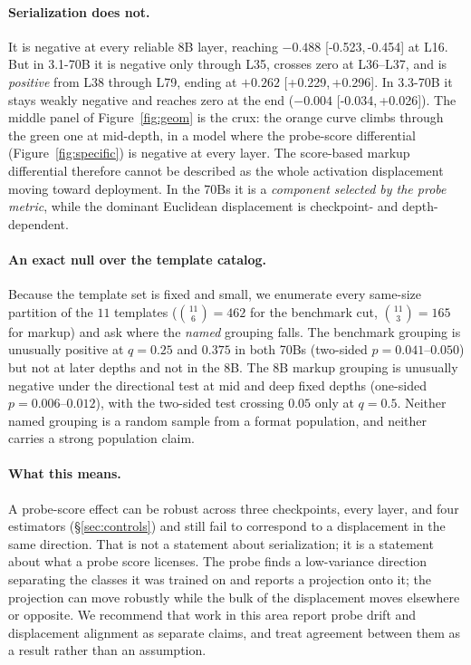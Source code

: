 \documentclass[10pt]{article}
\newcommand{\ci}[2]{{\footnotesize[#1,\,#2]}}
\begin{document}
\paragraph{Serialization does not.} It is negative at every reliable 8B layer,
reaching $-0.488$ \ci{-0.523}{-0.454} at L16. But in 3.1-70B it is negative only
through L35, crosses zero at L36--L37, and is \emph{positive} from L38 through
L79, ending at $+0.262$ \ci{+0.229}{+0.296}. In 3.3-70B it stays weakly negative
and reaches zero at the end ($-0.004$ \ci{-0.034}{+0.026}). The middle panel of
Figure~\ref{fig:geom} is the crux: the orange curve climbs through the green one
at mid-depth, in a model where the probe-score differential
(Figure~\ref{fig:specific}) is negative at every layer. The score-based markup
differential therefore cannot be described as the whole activation displacement
moving toward deployment. In the 70Bs it is a \emph{component selected by the
probe metric}, while the dominant Euclidean displacement is checkpoint- and
depth-dependent.

\paragraph{An exact null over the template catalog.} Because the template set is
fixed and small, we enumerate every same-size partition of the $11$ templates
($\binom{11}{6} = 462$ for the benchmark cut, $\binom{11}{3} = 165$ for markup)
and ask where the \emph{named} grouping falls. The benchmark grouping is
unusually positive at $q = 0.25$ and $0.375$ in both 70Bs (two-sided
$p = 0.041$--$0.050$) but not at later depths and not in the 8B. The 8B markup
grouping is unusually negative under the directional test at mid and deep fixed
depths (one-sided $p = 0.006$--$0.012$), with the two-sided test crossing $0.05$
only at $q = 0.5$. Neither named grouping is a random sample from a format
population, and neither carries a strong population claim.

\paragraph{What this means.} A probe-score effect can be robust across three
checkpoints, every layer, and four estimators (\S\ref{sec:controls}) and still
fail to correspond to a displacement in the same direction. That is not a
statement about serialization; it is a statement about what a probe score
licenses. The probe finds a low-variance direction separating the classes it was
trained on and reports a projection onto it; the projection can move robustly
while the bulk of the displacement moves elsewhere or opposite. We recommend
that work in this area report probe drift and displacement alignment as separate
claims, and treat agreement between them as a result rather than an assumption.
\end{document}
